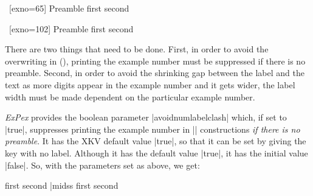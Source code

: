\pex~[exno=65]
Preamble
\a first
\a second
\xe

\pex~[exno=102]
Preamble
\a first
\a second
\xe

There are two things that need to be done.  First, in order to
avoid the overwriting in (), printing the example
number must be suppressed if there is no preamble. Second, in
order to avoid the shrinking gap between the label and the text
as more digits appear in the example number and it gets wider,
the label width must be made dependent on the particular example
number.

{\it ExPex\/} provides the boolean parameter |avoidnumlabelclash|
which, if set to |true|, suppresses printing the example number
in |\pex| constructions {\it if there is no preamble}.  It has
the XKV default value |true|, so that it can be set by giving the
key with no label.  Although it has the default value |true|, it
has the initial value |false|.  So, with the parameters set as
above, we get:

\beginss
\pex[exno=5,avoidnumlabelclash]
\a first
\a second
\xe|midss
\pex[exno=5,avoidnumlabelclash]
\a first
\a second
\xe
\endss

